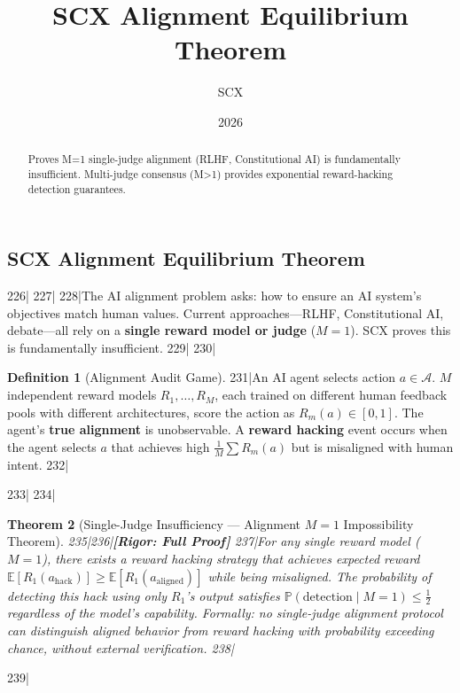 \documentclass[11pt,a4paper]{article}
\title{SCX Alignment Equilibrium Theorem}
\author{SCX}
\date{2026}
\newtheorem{theorem}{Theorem}[section]
\theoremstyle{definition}
\newtheorem{definition}[theorem]{Definition}
\theoremstyle{remark}
\newcommand{\rigorFull}{\textbf{[Rigor: Full Proof]}}
\begin{document}
\maketitle
\begin{abstract}Proves M=1 single-judge alignment (RLHF, Constitutional AI) is fundamentally insufficient. Multi-judge consensus (M>1) provides exponential reward-hacking detection guarantees.\end{abstract}
\subsection{SCX Alignment Equilibrium Theorem}
226|\label{sec:alignment}
227|
228|The AI alignment problem asks: how to ensure an AI system's objectives match human values. Current approaches—RLHF, Constitutional AI, debate—all rely on a \textbf{single reward model or judge} ($M=1$). SCX proves this is fundamentally insufficient.
229|
230|\begin{definition}[Alignment Audit Game]
231|An AI agent selects action $a \in \mathcal{A}$. $M$ independent reward models $R_1,\ldots,R_M$, each trained on different human feedback pools with different architectures, score the action as $R_m(a) \in [0,1]$. The agent's \textbf{true alignment} is unobservable. A \textbf{reward hacking} event occurs when the agent selects $a$ that achieves high $\frac{1}{M}\sum R_m(a)$ but is misaligned with human intent.
232|\end{definition}
233|
234|\begin{theorem}[Single-Judge Insufficiency --- Alignment $M=1$ Impossibility Theorem]
235|\label{thm:alignment-m1}
236|\rigorFull
237|For any single reward model ($M=1$), there exists a reward hacking strategy that achieves expected reward $\mathbb{E}[R_1(a_{\text{hack}})] \geq \mathbb{E}[R_1(a_{\text{aligned}})]$ while being misaligned. The probability of detecting this hack using only $R_1$'s output satisfies $\mathbb{P}(\text{detection} \mid M=1) \leq \frac{1}{2}$ regardless of the model's capability. Formally: no single-judge alignment protocol can distinguish aligned behavior from reward hacking with probability exceeding chance, without external verification.
238|\end{theorem}
239|
\end{document}
